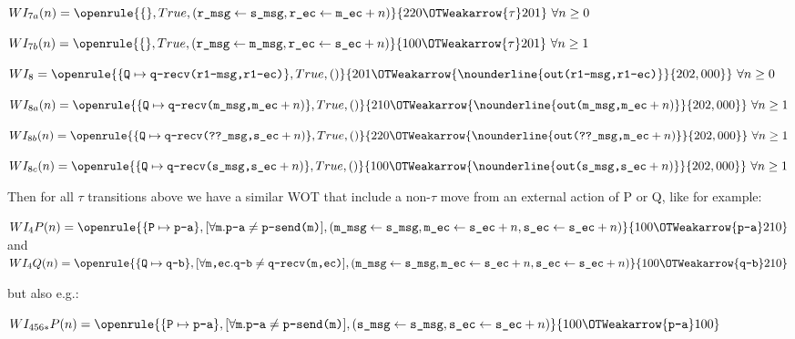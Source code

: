 $ WI_{7a}(n) = \openrule
         {\{\}, True, (\texttt{r\_msg}\gets \texttt{s\_msg}, \texttt{r\_ec}\gets \texttt{m\_ec}+n)}
         {220 \OTWeakarrow {\tau} 201}
         \ \forall n\ge 0$
         
$ WI_{7b}(n) = \openrule
         {\{\}, True, (\texttt{r\_msg}\gets \texttt{m\_msg}, \texttt{r\_ec}\gets \texttt{s\_ec}+n)}
         {100 \OTWeakarrow {\tau} 201}
         \ \forall n\ge 1$
                 
$ WI_8 = \openrule
         {\{\texttt{Q}\mapsto \texttt{q-recv(r1-msg,r1-ec)}\}, True, ()}
         {201 \OTWeakarrow {\nounderline{\texttt{out(r1-msg,r1-ec)}}} \{202, 000\}}
         \ \forall n\ge 0$

$ WI_{8a}(n) = \openrule
         {\{\texttt{Q}\mapsto \texttt{q-recv(m\_msg,m\_ec}+n)\}, True, ()}
         {210 \OTWeakarrow {\nounderline{\texttt{out(m\_msg,m\_ec}+n)}} \{202, 000\}}
         \ \forall n\ge 1$

 $ WI_{8b}(n) = \openrule
         {\{\texttt{Q}\mapsto \texttt{q-recv(??\_msg,s\_ec}+n)\}, True, ()}
         {220 \OTWeakarrow {\nounderline{\texttt{out(??\_msg,m\_ec}+n)}} \{202, 000\}}
         \ \forall n\ge 1$

 $ WI_{8c}(n) = \openrule
         {\{\texttt{Q}\mapsto \texttt{q-recv(s\_msg,s\_ec}+n)\}, True, ()}
         {100 \OTWeakarrow {\nounderline{\texttt{out(s\_msg,s\_ec}+n)}} \{202, 000\}}
         \ \forall n\ge 1$



\medskip
Then for all $\tau$ transitions above we have a similar WOT that include a non-$\tau$ move from an external action of P or Q, like for example:

$ WI_4P(n) = \openrule
         {\{\texttt{P}\mapsto \texttt{p-a}\}, [\forall \texttt{m}. \texttt{p-a} \neq \texttt{p-send(m)} ], 
   (\texttt{m\_msg}\gets \texttt{s\_msg}, \texttt{m\_ec}\gets \texttt{s\_ec}+n, \texttt{s\_ec}\gets \texttt{s\_ec}+n)}
         {100 \OTWeakarrow {\texttt{p-a}} 210}
$
and
$ WI_4Q(n) = \openrule
         {\{\texttt{Q}\mapsto \texttt{q-b}\}, [\forall \texttt{m,ec}. \texttt{q-b} \neq \texttt{q-recv(m,ec)} ],
   (\texttt{m\_msg}\gets \texttt{s\_msg}, \texttt{m\_ec}\gets \texttt{s\_ec}+n, \texttt{s\_ec}\gets \texttt{s\_ec}+n)}
         {100 \OTWeakarrow {\texttt{q-b}} 210}
$

but also e.g.:

$ WI_{456*}P(n) = \openrule
        {\{\texttt{P}\mapsto \texttt{p-a}\}, [\forall \texttt{m}. \texttt{p-a} \neq \texttt{p-send(m)} ], 
    (\texttt{s\_msg}\gets \texttt{s\_msg}, \texttt{s\_ec}\gets \texttt{s\_ec}+n)}
  {100 \OTWeakarrow {\texttt{p-a}} 100}
        $

